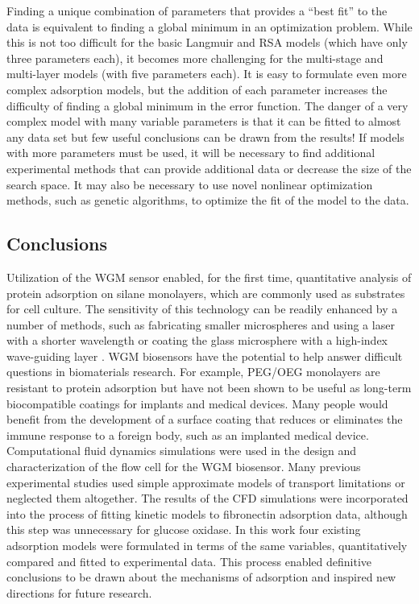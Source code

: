 Finding a unique combination of parameters that provides a {}``best
fit'' to the data is equivalent to finding a global minimum in an
optimization problem. While this is not too difficult for the basic
Langmuir and RSA models (which have only three parameters each), it
becomes more challenging for the multi-stage and multi-layer models
(with five parameters each). It is easy to formulate even more complex
adsorption models, but the addition of each parameter increases the
difficulty of finding a global minimum in the error function. The
danger of a very complex model with many variable parameters is that
it can be fitted to almost any data set but few useful conclusions
can be drawn from the results! If models with more parameters must
be used, it will be necessary to find additional experimental methods
that can provide additional data or decrease the size of the search
space. It may also be necessary to use novel nonlinear optimization
methods, such as genetic algorithms, to optimize the fit of the model
to the data.


\subsection{Conclusions}

Utilization of the WGM sensor enabled, for the first time, quantitative
analysis of protein adsorption on silane monolayers, which are commonly
used as substrates for cell culture. The sensitivity of this technology
can be readily enhanced by a number of methods, such as fabricating
smaller microspheres and using a laser with a shorter wavelength \cite{Vollmer2008a}
or coating the glass microsphere with a high-index wave-guiding layer
\cite{Teraoka2006}. WGM biosensors have the potential to help answer
difficult questions in biomaterials research. For example, PEG/OEG
monolayers are resistant to protein adsorption but have not been shown
to be useful as long-term biocompatible coatings for implants and
medical devices. Many people would benefit from the development of
a surface coating that reduces or eliminates the immune response to
a foreign body, such as an implanted medical device. Computational
fluid dynamics simulations were used in the design and characterization
of the flow cell for the WGM biosensor. Many previous experimental
studies used simple approximate models of transport limitations or
neglected them altogether. The results of the CFD simulations were
incorporated into the process of fitting kinetic models to fibronectin
adsorption data, although this step was unnecessary for glucose oxidase.
In this work four existing adsorption models were formulated in terms
of the same variables, quantitatively compared and fitted to experimental
data. This process enabled definitive conclusions to be drawn about
the mechanisms of adsorption and inspired new directions for future
research.
